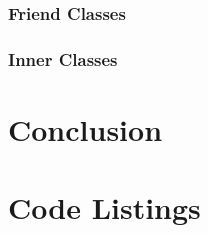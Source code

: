\documentclass[11pt, a4paper, twocolumn]{article}
\begin{document}
\subsubsection{Friend Classes}
\label{sec:friend}

\subsubsection{Inner Classes}
\label{sec:inner}

\section{Conclusion}






\printbibliography[heading = bibnumbered]

\section{Code Listings}

\end{document}
